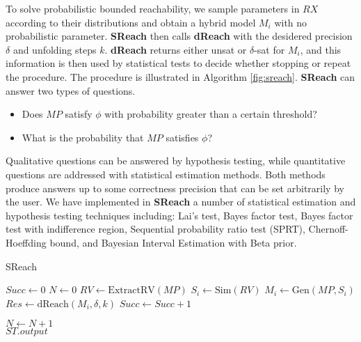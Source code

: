 To solve probabilistic bounded reachability, we sample parameters in $RX$ according 
to their distributions and obtain a hybrid model $M_i$ with no probabilistic 
parameter. {\bf SReach} then calls {\bf dReach} \cite{gaodelta} with the desidered precision $\delta$ and 
unfolding steps $k$. {\bf dReach} returns either unsat or $\delta$-sat for $M_i$, and this information
is then used by statistical tests to decide whether stopping or repeat the procedure. The procedure is illustrated in Algorithm \ref{fig:sreach}. {\bf SReach} can answer two types of questions. 
\begin{itemize}
\item Does $MP$ satisfy $\phi$ with probability
greater than a certain threshold? 
\item What is the probability that $MP$ satisfies $\phi$?
\end{itemize}
Qualitative questions can be answered by hypothesis testing, while quantitative questions are addressed with
statistical estimation methods. Both methods produce answers up to some correctness 
precision that can be set arbitrarily by the user.
We have implemented in {\bf SReach} a number of statistical estimation and hypothesis testing techniques including: {Lai's test}, {Bayes factor test}, {Bayes factor test with indifference region}, {Sequential probability ratio test (SPRT)}, {Chernoff-Hoeffding bound}, and Bayesian Interval Estimation with Beta prior.  
\begin{algorithm}
  \centering
  \caption{SReach}
  \label{fig:sreach}
  \begin{algorithmic}[1]
        \State $Succ \gets 0$	
        \State $N \gets 0$	
        \State $RV \gets \mathrm{ExtractRV}(MP)$	
        \Repeat
            \State $S_i \gets \mathrm{Sim}(RV)$		
            \State $M_i \gets \mathrm{Gen}(MP, S_i)$	
            \State $Res \gets \mathrm{dReach}(M_i, \delta, k)$	
		\State $Succ \gets Succ + 1$
	    
	  \EndIf
	\State $N \gets N + 1$
        	\\
	\quad\hspace{0.5ex} \Return $ST.output$
   \EndFunction
  \end{algorithmic}
\end{algorithm}

